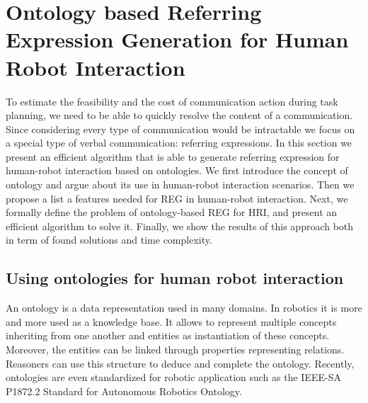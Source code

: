 \documentclass[a4paper,11pt,twoside]{StyleThese}
\begin{document}
\section{Ontology based Referring Expression Generation for Human Robot Interaction}
To estimate the feasibility and the cost of communication action during task planning, we need to be able to quickly resolve the content of a communication. Since considering every type of communication would be intractable we focus on a special type of verbal communication: referring expressions.
In this section we present an efficient algorithm that is able to generate referring expression for human-robot interaction based on ontologies. We first introduce the concept of ontology and argue about its use in human-robot interaction scenarios. Then we propose a list a features needed for REG in human-robot interaction. Next, we formally define the problem of ontology-based REG for HRI, and present an efficient algorithm to solve it. Finally, we show the results of this approach both in term of found solutions and time complexity.

\subsection{Using ontologies for human robot interaction}
An ontology is a data representation used in many domains. In robotics it is more and more used as a knowledge base. It allows to represent multiple concepts inheriting from one another and entities as instantiation of these concepts. Moreover, the entities can be linked through properties representing relations. Reasoners can use this structure to deduce and complete the ontology. Recently, ontologies are even standardized for robotic application such as the IEEE-SA P1872.2 Standard for Autonomous Robotics Ontology.
\end{document}
